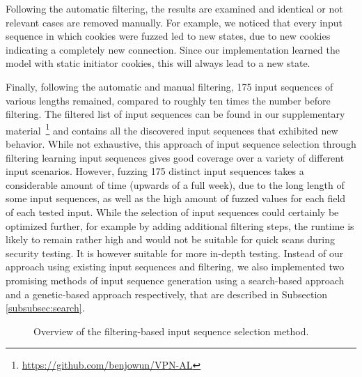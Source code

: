 Following the automatic filtering, the results are examined and identical or not relevant cases are removed manually. For example, we noticed that every input sequence in which cookies were fuzzed led to new states, due to new cookies indicating a completely new connection. Since our implementation learned the model with static initiator cookies, this will always lead to a new state. 

Finally, following the automatic and manual filtering, 175 input sequences of various lengths remained, compared to roughly ten times the number before filtering. The filtered list of input sequences can be found in our supplementary material~\footnote{\url{https://github.com/benjowun/VPN-AL}} and contains all the discovered input sequences that exhibited new behavior. While not exhaustive, this approach of input sequence selection through filtering learning input sequences gives good coverage over a variety of different input scenarios. However, fuzzing 175 distinct input sequences takes a considerable amount of time (upwards of a full week), due to the long length of some input sequences, as well as the high amount of fuzzed values for each field of each tested input. While the selection of input sequences could certainly be optimized further, for example by adding additional filtering steps, the runtime is likely to remain rather high and would not be suitable for quick scans during security testing. It is however suitable for more in-depth testing. Instead of our approach using existing input sequences and filtering, we also implemented two promising methods of input sequence generation using a search-based approach and a genetic-based approach respectively, that are described in Subsection \ref{subsubsec:search}.

\begin{figure}
\begin{centering}
\caption{Overview of the filtering-based input sequence selection method.}
\label{fig:fuzz_filtering}
\end{centering}
\end{figure}

